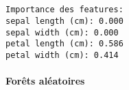 \documentclass[11pt]{article}
\begin{document}
    \begin{center}
    \end{center}
    { \hspace*{\fill} \\}
    
    \begin{center}
    \end{center}
    { \hspace*{\fill} \\}
    
    \begin{center}
    \end{center}
    { \hspace*{\fill} \\}
    
    \begin{Verbatim}[commandchars=\\\{\}]

Importance des features:
sepal length (cm): 0.000
sepal width (cm): 0.000
petal length (cm): 0.586
petal width (cm): 0.414
    \end{Verbatim}

    \paragraph{Forêts aléatoires}\label{foruxeats-aluxe9atoires}
\end{document}
